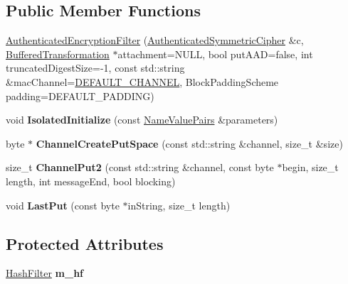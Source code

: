\subsection*{Public Member Functions}
\begin{DoxyCompactItemize}
\item 
\hyperlink{class_authenticated_encryption_filter_ab50017b68574475d37fc726717fde546}{AuthenticatedEncryptionFilter} (\hyperlink{class_authenticated_symmetric_cipher}{AuthenticatedSymmetricCipher} \&c, \hyperlink{class_buffered_transformation}{BufferedTransformation} $\ast$attachment=NULL, bool putAAD=false, int truncatedDigestSize=-\/1, const std::string \&macChannel=\hyperlink{cryptlib_8h_a6f1917f54ea8c2a45de6e08c5087c8de}{DEFAULT\_\-CHANNEL}, BlockPaddingScheme padding=DEFAULT\_\-PADDING)
\item 
\hypertarget{class_authenticated_encryption_filter_aad275712b531d24e3ac4d332d46f1dd4}{
void {\bfseries IsolatedInitialize} (const \hyperlink{class_name_value_pairs}{NameValuePairs} \&parameters)}
\label{class_authenticated_encryption_filter_aad275712b531d24e3ac4d332d46f1dd4}

\item 
\hypertarget{class_authenticated_encryption_filter_ac7f154223d3f1661d5aa5623d2f50739}{
byte $\ast$ {\bfseries ChannelCreatePutSpace} (const std::string \&channel, size\_\-t \&size)}
\label{class_authenticated_encryption_filter_ac7f154223d3f1661d5aa5623d2f50739}

\item 
\hypertarget{class_authenticated_encryption_filter_a061422f8897f1a9545ba47f7ff0d8d5b}{
size\_\-t {\bfseries ChannelPut2} (const std::string \&channel, const byte $\ast$begin, size\_\-t length, int messageEnd, bool blocking)}
\label{class_authenticated_encryption_filter_a061422f8897f1a9545ba47f7ff0d8d5b}

\item 
\hypertarget{class_authenticated_encryption_filter_a372eb12964b7974cf58154589ede32ad}{
void {\bfseries LastPut} (const byte $\ast$inString, size\_\-t length)}
\label{class_authenticated_encryption_filter_a372eb12964b7974cf58154589ede32ad}

\end{DoxyCompactItemize}
\subsection*{Protected Attributes}
\begin{DoxyCompactItemize}
\item 
\hypertarget{class_authenticated_encryption_filter_a34bcc55ffe051b1ee589a39d41cf4812}{
\hyperlink{class_hash_filter}{HashFilter} {\bfseries m\_\-hf}}
\label{class_authenticated_encryption_filter_a34bcc55ffe051b1ee589a39d41cf4812}

\end{DoxyCompactItemize}


